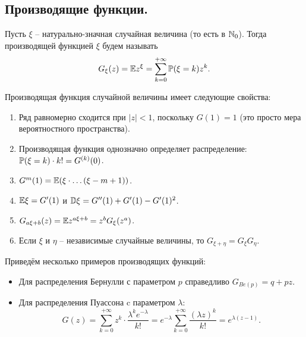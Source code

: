 \subsection{Производящие функции.}
\begin{definition}
    Пусть $\xi$ -- натурально-значная случайная величина (то есть в $\N_0$).
    Тогда производящей функцией $\xi$ будем называть
    \[
        G_{\xi}(z) = \Ex z^{\xi} = \sum\limits_{k = 0}^{+\infty} \P(\xi = k)z^k.
    \]
\end{definition}
Производящая функция случайной величины имеет следующие свойства:
\begin{enumerate}
    \item Ряд равномерно сходится при $|z| < 1$, поскольку $G(1) = 1$ (это просто мера вероятностного пространства).
    \item Производящая функция однозначно определяет распределение: $\P(\xi = k)\cdot k! = G^{(k)}(0)$.
    \item $G^{m}(1) = \Ex (\xi \cdot \ldots (\xi - m + 1))$.
    \item $\Ex \xi = G'(1)$ и $\D \xi = G''(1) + G'(1) - G'(1)^2$.
    \item $G_{a\xi + b}(z) = \Ex z^{a\xi + b} = z^b G_{\xi}(z^a)$.
    \item Если $\xi$ и $\eta$ -- независимые случайные величины, то $G_{\xi + \eta} = G_{\xi}G_{\eta}$.
\end{enumerate}
\begin{example}
    Приведём несколько примеров производящих функций:
    \begin{itemize}
        \item Для распределения Бернулли с параметром $p$ справедливо $G_{Be(p)} = q + pz$.
        \item Для распределения Пуассона c параметром $\lambda$:
        \[
            G(z) = \sum\limits_{k = 0}^{+\infty} z^k \cdot \dfrac{\lambda^k e^{-\lambda}}{k!} = e^{-\lambda} \sum\limits_{k = 0}^{+\infty} \dfrac{(\lambda z)^k}{k!} = e^{\lambda(z - 1)}.
        \]
    \end{itemize}
\end{example}

